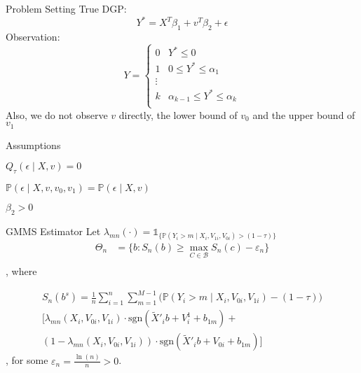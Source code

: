 \documentclass[xcolor=dvipsnames]{beamer}
\begin{document}
\begin{frame}{Problem Setting}
    True DGP:
    \begin{equation}
        Y^{\ast} = X^{T}\beta_{1} + v^{T}\beta_{2} + \epsilon
    \end{equation}
    Observation:
\begin{equation}
    Y = \begin{cases}
        0 & Y^{\ast} \le 0 \\
        1 & 0 \le Y^{\ast} \le \alpha_{1} \\
        \vdots &  \\
        k & \alpha_{k-1} \le Y^{\ast} \le \alpha_{k} \\
    \end{cases}
\end{equation}
Also, we do not observe $v$ directly, the lower bound of $v_{0}$ and the upper bound of $v_{1}$ 
\end{frame}

\begin{frame}{Assumptions}
    \begin{assumption}[1]
        $Q_{\tau}(\epsilon \mid X, v) = 0$
    \end{assumption}
    
    \begin{assumption}[2]
        $\mathbb{P}\left(\epsilon \mid X, v, v_{0}, v_{1}\right) = \mathbb{P}\left(\epsilon \mid X, v\right)$
    \end{assumption}
    
    \begin{assumption}[3]
        $\beta_{2} > 0$
    \end{assumption}
\end{frame}

\begin{frame}{GMMS Estimator}
    Let $\lambda_{mn}(\cdot) = \mathbb{1}_{\{ \mathbb{P}\left( Y_i > m \mid X_i, V_{1 i}, V_{0 i}\right) > (1 - \tau)\}}$
\begin{equation*}
    \begin{aligned}
        \Theta_n &= \{ b: S_{n}(b) \ge \max_{C \in \mathcal{B}} S_{n}(c) - \varepsilon_{n}\}\\
    \end{aligned}
\end{equation*}
, where

\begin{multline*}
    S_n(b^s) = \frac{1}{n} \sum_{i=1}^n \sum_{m=1}^{M-1} \biggl(\mathbb{P}(Y_i > m \mid X_i, V_{0i}, V_{1i}) - (1 - \tau)\biggl) \\
    \biggl[ \lambda_{mn}(X_i, V_{0i}, V_{1i}) \cdot \text{sgn}(\tilde{X}'_i b + V^1_i + b_{1m}) + \\
    (1 - \lambda_{mn}(X_i, V_{0i}, V_{1i})) \cdot \text{sgn}(\tilde{X}'_i b + V_{0i} + b_{1m}){\biggl]}
\end{multline*}
    , for some $\varepsilon_{n} = \frac{\ln(n)}{n} > 0$.

\end{frame}
\end{document}
